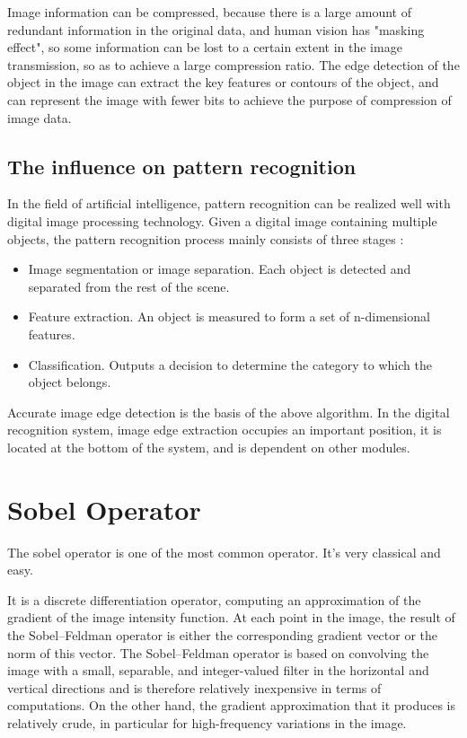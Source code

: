 \documentclass[review]{cvpr}
\begin{document}
Image information can be compressed, because there is a large amount of redundant information in the original data, and human vision has "masking effect", so some information can be lost to a certain extent in the image transmission, so as to achieve a large compression ratio. The edge detection of the object in the image can extract the key features or contours of the object, and can represent the image with fewer bits to achieve the purpose of compression of image data.



\subsection{The influence on pattern recognition}

In the field of artificial intelligence, pattern recognition can be realized well with digital image processing technology. Given a digital image containing multiple objects, the pattern recognition process mainly consists of three stages :

\begin{itemize}
  \item Image segmentation or image separation. Each object is detected and separated from the rest of the scene. 
  \item Feature extraction. An object is measured to form a set of n-dimensional features. 
  \item Classification. Outputs a decision to determine the category to which the object belongs. 
\end{itemize}

Accurate image edge detection is the basis of the above algorithm. In the digital recognition system, image edge extraction occupies an important position, it is located at the bottom of the system, and is dependent on other modules.

\section{Sobel Operator}

The sobel operator is one of the most common operator. It's very classical and easy.

It is a discrete differentiation operator, computing an approximation of the gradient of the image intensity function. At each point in the image, the result of the Sobel–Feldman operator is either the corresponding gradient vector or the norm of this vector. The Sobel–Feldman operator is based on convolving the image with a small, separable, and integer-valued filter in the horizontal and vertical directions and is therefore relatively inexpensive in terms of computations. On the other hand, the gradient approximation that it produces is relatively crude, in particular for high-frequency variations in the image.
\end{document}
